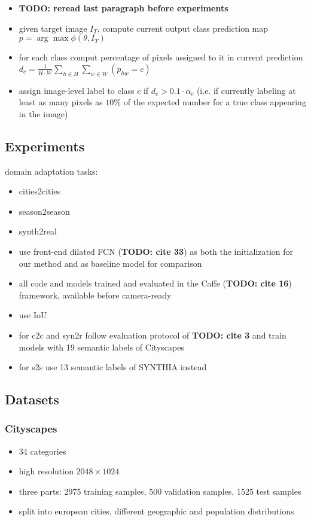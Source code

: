 \documentclass[]{article}
\newcommand{\todo}[1]{{\color{red}\bf{TODO: #1}}}
\begin{document}
\begin{itemize}
	\item \todo{reread last paragraph before experiments}
	\item given target image $I_T$, compute current output class prediction map $p = \arg \max \phi (\theta, I_T)$
	\item for each class comput percentage of pixels assigned to it in current prediction $d_c = \frac{1}{H\cdot W} \sum_{h\in H} \sum_{w\in W}(p_{hw} = c)$
	\item assign image-level label to class $c$ if $d_c > 0.1 \cdot \alpha_c$ (i.e. if currently labeling at least as many pixels as $10\%$ of the expected number for a true class appearing in the image)
\end{itemize}

\subsection{Experiments}
domain adaptation tasks:
\begin{itemize}
	\item cities2cities
	\item season2season
	\item synth2real
	\item use front-end dilated FCN (\todo{cite 33}) as both the initialization for our method and as baseline model for comparison
	\item all code and models trained and evaluated in the Caffe (\todo{cite 16}) framework, available before camera-ready
	\item use IoU
	\item for c2c and syn2r follow evaluation protocol of \todo{cite 3} and train models with 19 semantic labels of Cityscapes
	\item for s2s use 13 semantic labels of SYNTHIA instead
\end{itemize}

\subsection{Datasets}

\subsubsection{Cityscapes}
\begin{itemize}
	\item 34 categories
	\item high resolution $2048 \times 1024$
	\item three parts: 2975 training samples, 500 validation samples, 1525 test samples
	\item split into european cities, different geographic and population distributions
\end{itemize}
\end{document}
